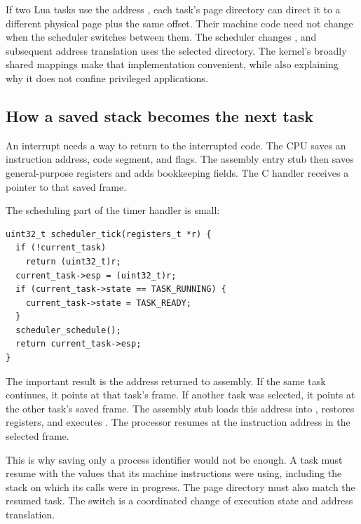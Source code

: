 \documentclass[11pt,a4paper]{scrartcl}
\newcommand{\code}[1]{\texttt{\detokenize{#1}}}
\begin{document}
If two Lua tasks use the address \code{0x50001234}, each task's page
directory can direct it to a different physical page plus the same offset.
Their machine code need not change when the scheduler switches between
them. The scheduler changes \code{CR3}, and subsequent address translation
uses the selected directory. The kernel's broadly shared mappings make
that implementation convenient, while also explaining why it does not
confine privileged applications.

\subsection{How a saved stack becomes the next task}

An interrupt needs a way to return to the interrupted code. The CPU saves
an instruction address, code segment, and flags. The assembly entry stub
then saves general-purpose registers and adds bookkeeping fields. The C
handler receives a pointer to that saved frame.

The scheduling part of the timer handler is small:

\par\medskip
\noindent\begin{minipage}{\linewidth}
\begin{lstlisting}[style=CStyle,caption={scheduler\_tick in stage2/scheduler.c.}]
uint32_t scheduler_tick(registers_t *r) {
  if (!current_task)
    return (uint32_t)r;
  current_task->esp = (uint32_t)r;
  if (current_task->state == TASK_RUNNING) {
    current_task->state = TASK_READY;
  }
  scheduler_schedule();
  return current_task->esp;
}
\end{lstlisting}
\end{minipage}
\par\medskip

The important result is the address returned to assembly. If the same task
continues, it points at that task's frame. If another task was selected,
it points at the other task's saved frame. The assembly stub loads this
address into \code{ESP}, restores registers, and executes \code{iret}.
The processor resumes at the instruction address in the selected frame.

This is why saving only a process identifier would not be enough. A task
must resume with the values that its machine instructions were using,
including the stack on which its calls were in progress. The page
directory must also match the resumed task. The switch is a coordinated
change of execution state and address translation.
\end{document}
